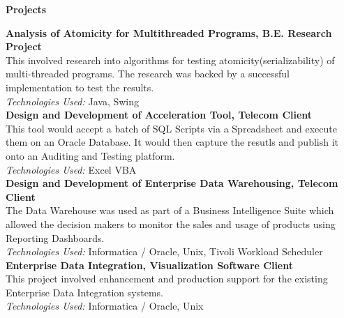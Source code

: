 \documentclass[a4paper,12pt,final]{memoir}
\newcommand{\Sep}{\vspace{1.5em}}
\newcommand{\SmallSep}{\vspace{0.5em}}
\newcommand{\CVSection}[1]
	{\Large\textbf{#1}\par
	\SmallSep\normalsize\normalfont}
\newcommand{\CVItem}[1]
	{\textbf{\color{Plum} #1}}
\begin{document}
\CVSection{Projects}
\CVItem{Analysis of Atomicity for Multithreaded Programs, B.E. Research Project}\\
{\footnotesize This involved research into algorithms for testing atomicity(serializability) of multi-threaded programs. The research was backed by a successful implementation to test the results.\\
	\emph{Technologies Used:} Java\texttrademark, Swing}%
\SmallSep\\
\CVItem{Design and Development of Acceleration Tool, Telecom Client}\\
{\footnotesize This tool would accept a batch of SQL Scripts via a Spreadsheet and execute them on an Oracle Database. It would then capture the resutls and publish it onto an Auditing and Testing platform.\\ \emph{Technologies Used:} Excel VBA
}	
\SmallSep\\
\CVItem{Design and Development of Enterprise Data Warehousing, Telecom Client}\\
{\footnotesize The Data Warehouse was used as part of a Business Intelligence Suite which allowed the decision makers to monitor the sales and usage of products using Reporting Dashboards.\\ \emph{Technologies Used:} Informatica / Oracle, Unix, Tivoli Workload Scheduler
}	
\SmallSep\\
\CVItem{Enterprise Data Integration, Visualization Software Client}\\
{\footnotesize This project involved enhancement and production support for the existing Enterprise Data Integration systems.\\ \emph{Technologies Used:} Informatica / Oracle, Unix}
\SmallSep\\
\end{document}
